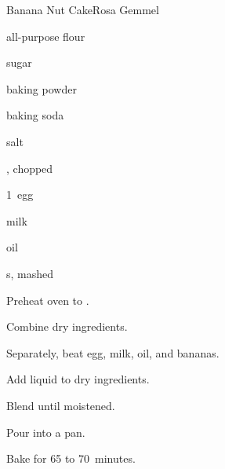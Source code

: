 \begin{recipe}{Banana Nut Cake}{Rosa Gemmel}{}

\begin{ingredients}
\item {} all-purpose flour
\item \C{\half} sugar
\item {} baking powder
\item \tp{\half} baking soda
\item \tp{\half} salt
\item \C{\half} , chopped
\item 1~egg
\item \C{\threequarter} milk
\item \C{\half} oil
\item \C{1\half} s, mashed
\end{ingredients}

\begin{directions}
\item Preheat oven to .
\item Combine dry ingredients.
\item Separately, beat egg, milk, oil, and bananas.
\item Add liquid to dry ingredients.
\item Blend until moistened.
\item Pour into a pan.
\item Bake for 65 to 70~minutes.
\end{directions}

\end{recipe}
